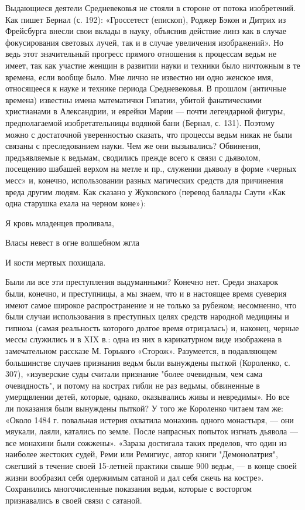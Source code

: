 Выдающиеся  деятели  Средневековья  не  стояли  в  стороне  от  потока
изобретений. Как пишет Бернал  (с. 192): «Гроссетест (епископ), Роджер
Бэкон  и Дитрих  из Фрейсбурга  внесли свои  вклады в  науку, объяснив
действие  линз как  в случае  фокусирования  световых лучей,  так и  в
случае  увеличения изображений».  Но ведь  этот значительный  прогресс
прямого отношения к процессам ведьм не имеет, так как участие женщин в
развитии  науки и  техники было  ничтожным в  те времена,  если вообще
было.  Мне  лично не  известно  ни  одно  женское имя,  относящееся  к
науке и  технике периода  Средневековья. В прошлом  (античные времена)
известны имена  математички Гипатии, убитой  фанатическими христианами
в  Александрии,   и  еврейки  Марии  ---   почти  легендарной  фигуры,
предполагаемой изобретательницы водяной бани (Бернал, с. 131). Поэтому
можно с достаточной уверенностью сказать,  что процессы ведьм никак не
были связаны с преследованием науки. Чем же они вызывались? Обвинения,
предъявляемые к  ведьмам, сводились прежде  всего к связи  с дьяволом,
посещению  шабашей верхом  на метле  и пр.,  служении дьяволу  в форме
«черных месс» и, конечно,  использовании разных магических средств для
причинения  вреда  другим людям.  Как  сказано  у Жуковского  (перевод
баллады Саути «Как одна старушка ехала на черном коне»):

Я кровь младенцев проливала,

Власы невест в огне волшебном жгла

И кости мертвых похищала.

Были ли все эти преступления  выдуманными? Конечно нет. Среди знахарок
были, конечно,  и преступницы,  а мы  знаем, что  и в  настоящее время
суеверия имеют самое  широкое распространение и не  только за рубежом;
несомненно, что  были случаи использования в  преступных целях средств
народной медицины  и гипноза  (самая реальность которого  долгое время
отрицалась) и, наконец, черные мессы служились и в XIX в.: одна из них
в карикатурном  виде изображена  в замечательном рассказе  М. Горького
«Сторож».  Разумеется,  в  подавляющем большинстве  случаев  признания
ведьм  были вынуждены  пыткой  (Короленко, с.  307), «изуверские  суды
считали признание "более очевидным, чем сама очевидность", и потому на
кострах гибли не раз ведьмы,  обвиненные в умерщвлении детей, которые,
однако,  оказывались  живы и  невредимы».  Но  все ли  показания  были
вынуждены пыткой?  У того же Короленко  читаем там же: «Около  1484 г.
повальная истерия охватила монахинь одного монастыря, --- они мяукали,
лаяли, катались по земле. После  напрасных попыток изгнать дьявола ---
все  монахини были  сожжены».  «Зараза достигала  таких пределов,  что
один  из  наиболее жестоких  судей,  Реми  или Ремигиус,  автор  книги
"Демонолатрия", сжегший  в течение своей 15-летней  практики свыше 900
ведьм, --- в конце своей жизни  вообразил себя одержимым сатаной и дал
себя  сжечь на  костре». Сохранились  многочисленные показания  ведьм,
которые с восторгом признавались в своей связи с сатаной.

